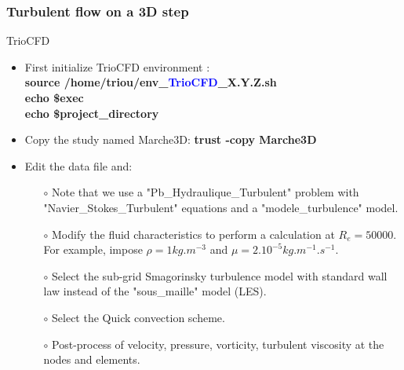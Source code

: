 \documentclass[10pt, hyperref={unicode=true,pdfusetitle, bookmarks=true,bookmarksnumbered=false,bookmarksopen=false, breaklinks=false,pdfborder={0 0 1},backref=true,colorlinks=true,linkcolor=darkblue,pageanchor}]{beamer}
\begin{document}
\begin{frame}
\frametitle{Turbulent flow on a 3D step}
\begin{block}{TrioCFD}

\begin{itemize}
\item First initialize TrioCFD environment :\\
{\small{
\textbf{source /home/triou/env\_\textcolor{blue}{TrioCFD}\_X.Y.Z.sh }\\
\textbf{echo \$exec} \\
\textbf{echo \$project\_directory} \\
}}

\item Copy the study named Marche3D: 
\textbf{trust -copy Marche3D}

\item Edit the data file and: \\
    \begin{itemize}
    \item [$\circ$] Note that we use a "Pb\_Hydraulique\_Turbulent" problem with "Navier\_Stokes\_Turbulent" equations and a "modele\_turbulence" model.
    \item [$\circ$] Modify the fluid characteristics to perform a calculation at $R_e=50000$. For example, impose $\rho = 1 kg.m^{-3}$ and $\mu=2.10^{-5} kg.m^{-1}.s^{-1}$.
    \item [$\circ$] Select the sub-grid Smagorinsky turbulence model with standard wall law instead of the "sous\_maille" model (LES).
    \item [$\circ$] Select the Quick convection scheme.
    \item [$\circ$] Post-process of velocity, pressure, vorticity, turbulent viscosity at the nodes and elements.
    \end{itemize}

\end{itemize}

\end{block}
\end{frame}
\end{document}
